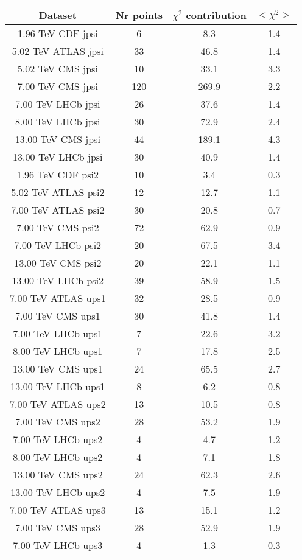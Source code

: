 \begin{table}[h!]
\centering
\begin{tabular}{c|c|c|c}
Dataset & Nr points & $\chi^2$ contribution & $<\chi^2>$ \\
\hline
1.96 TeV CDF jpsi & 6 & 8.3 & 1.4 \\
5.02 TeV ATLAS jpsi & 33 & 46.8 & 1.4 \\
5.02 TeV CMS jpsi & 10 & 33.1 & 3.3 \\
7.00 TeV CMS jpsi & 120 & 269.9 & 2.2 \\
7.00 TeV LHCb jpsi & 26 & 37.6 & 1.4 \\
8.00 TeV LHCb jpsi & 30 & 72.9 & 2.4 \\
13.00 TeV CMS jpsi & 44 & 189.1 & 4.3 \\
13.00 TeV LHCb jpsi & 30 & 40.9 & 1.4 \\
1.96 TeV CDF psi2 & 10 & 3.4 & 0.3 \\
5.02 TeV ATLAS psi2 & 12 & 12.7 & 1.1 \\
7.00 TeV ATLAS psi2 & 30 & 20.8 & 0.7 \\
7.00 TeV CMS psi2 & 72 & 62.9 & 0.9 \\
7.00 TeV LHCb psi2 & 20 & 67.5 & 3.4 \\
13.00 TeV CMS psi2 & 20 & 22.1 & 1.1 \\
13.00 TeV LHCb psi2 & 39 & 58.9 & 1.5 \\
7.00 TeV ATLAS ups1 & 32 & 28.5 & 0.9 \\
7.00 TeV CMS ups1 & 30 & 41.8 & 1.4 \\
7.00 TeV LHCb ups1 & 7 & 22.6 & 3.2 \\
8.00 TeV LHCb ups1 & 7 & 17.8 & 2.5 \\
13.00 TeV CMS ups1 & 24 & 65.5 & 2.7 \\
13.00 TeV LHCb ups1 & 8 & 6.2 & 0.8 \\
7.00 TeV ATLAS ups2 & 13 & 10.5 & 0.8 \\
7.00 TeV CMS ups2 & 28 & 53.2 & 1.9 \\
7.00 TeV LHCb ups2 & 4 & 4.7 & 1.2 \\
8.00 TeV LHCb ups2 & 4 & 7.1 & 1.8 \\
13.00 TeV CMS ups2 & 24 & 62.3 & 2.6 \\
13.00 TeV LHCb ups2 & 4 & 7.5 & 1.9 \\
7.00 TeV ATLAS ups3 & 13 & 15.1 & 1.2 \\
7.00 TeV CMS ups3 & 28 & 52.9 & 1.9 \\
7.00 TeV LHCb ups3 & 4 & 1.3 & 0.3 \\

\end{tabular}
\end{table}
